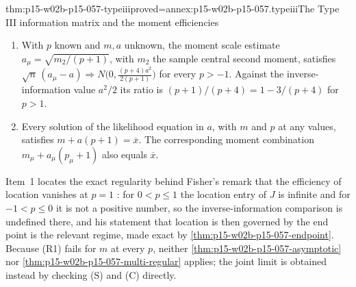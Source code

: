 \begin{hbtheorem}{thm:p15-w02b-p15-057-typeiii}{proved=annex:p15-w02b-p15-057.typeiii}{The Type III information matrix and the moment efficiencies}
\begin{enumerate}
\item With \(p\) known and \(m,a\) unknown, the moment scale estimate
 \(a_\mu=\sqrt{m_2/(p+1)}\), with \(m_2\) the sample central second
 moment, satisfies
 \(\sqrt n\,(a_\mu-a)\Rightarrow N\bigl(0,\frac{(p+4)a^2}{2(p+1)}\bigr)\)
 for every \(p>-1\). Against the inverse-information value \(a^2/2\) its
 ratio is \((p+1)/(p+4)=1-3/(p+4)\) for \(p>1\).
\item Every solution of the likelihood equation in \(a\), with \(m\) and
 \(p\) at any values, satisfies \(m+a(p+1)=\overline x\). The
 corresponding moment combination \(m_\mu+a_\mu(p_\mu+1)\) also equals
 \(\overline x\).
\end{enumerate}
\end{hbtheorem}

Item~1 locates the exact regularity behind Fisher's remark that the
efficiency of location vanishes at \(p=1\)
\cite[p.~333]{Fisher1922Foundations}: for \(0<p\leq1\) the location
entry of \(J\) is infinite and for \(-1<p\leq0\) it is not a positive
number, so the inverse-information comparison is undefined there, and his
statement that location is then governed by the end point
\cite[p.~337]{Fisher1922Foundations} is the relevant regime, made exact
by \cref{thm:p15-w02b-p15-057-endpoint}. Because
(R1) fails for \(m\) at every \(p\), neither
\cref{thm:p15-w02b-p15-057-asymptotic} nor
\cref{thm:p15-w02b-p15-057-multi-regular} applies; the joint limit is
obtained instead by checking (S) and (C) directly.

